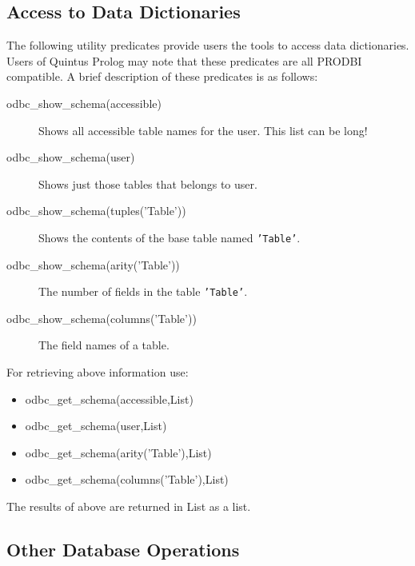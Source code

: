 \subsection{Access to Data Dictionaries}

The following utility predicates provide users the tools to access data 
dictionaries.  Users of Quintus Prolog may note that these predicates are all 
PRODBI compatible.  A brief description of these predicates is as follows:
\begin{description}

\item[odbc\_show\_schema(accessible)]
	 Shows all accessible table names for the user.  This list can be long!

\item[odbc\_show\_schema(user)]
	Shows just those tables that belongs to user.

\item[odbc\_show\_schema(tuples('Table'))]
	Shows the contents of the base table named {\tt 'Table'}.

\item[odbc\_show\_schema(arity('Table'))]
	The number of fields in the table {\tt 'Table'}.

\item[odbc\_show\_schema(columns('Table'))]
	The field names of a table.
\end{description}

For retrieving above information use:
\begin{itemize}

\item odbc\_get\_schema(accessible,List)
\item odbc\_get\_schema(user,List)
\item odbc\_get\_schema(arity('Table'),List)
\item odbc\_get\_schema(columns('Table'),List)
\end{itemize}

The results of above are returned in List as a list.

\subsection{Other Database Operations}

